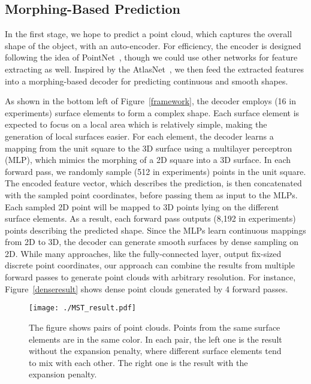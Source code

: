 \documentclass[letterpaper]{article} \usepackage{aaai20}  \usepackage{times}  \usepackage{helvet} \usepackage{courier}  \usepackage[hyphens]{url}  \usepackage{graphicx} \urlstyle{rm} \def\UrlFont{\rm}  \usepackage{graphicx}  \frenchspacing  \setlength{\pdfpagewidth}{8.5in}  \setlength{\pdfpageheight}{11in}  \usepackage{amsmath}
\begin{document}
\subsection{Morphing-Based Prediction} 
In the first stage, we hope to predict a point cloud, which captures the overall shape of the object, with an auto-encoder. For efficiency, the encoder is designed following the idea of PointNet~\cite{qi2017pointnet}, though we could use other networks for feature extracting as well. Inspired by the AtlasNet~\cite{groueix2018papier}, we then feed the extracted features into a morphing-based decoder for predicting continuous and smooth shapes.

As shown in the bottom left of Figure~\ref {framework}, the decoder employs  (16 in experiments) surface elements to form a complex shape. Each surface element is expected to focus on a local area which is relatively simple, making the generation of local surfaces easier. For each element, the decoder learns a mapping from the unit square  to the 3D surface using a multilayer perceptron (MLP), which mimics the morphing of a 2D square into a 3D surface. In each forward pass, we randomly sample  (512 in experiments) points in the unit square. The encoded feature vector, which describes the prediction, is then concatenated with the sampled point coordinates, before passing them as input to the  MLPs. Each sampled 2D point will be mapped to  3D points lying on the  different surface elements. As a result, each forward pass outputs  (8,192 in experiments) points describing the predicted shape. Since the MLPs learn continuous mappings from 2D to 3D, the decoder can generate smooth surfaces by dense sampling on 2D. While many approaches, like the fully-connected layer, output fix-sized discrete point coordinates, our approach can combine the results from multiple forward passes to generate point clouds with arbitrary resolution. For instance, Figure~\ref{denseresult} shows dense point clouds generated by 4 forward passes.


\begin{figure}[t]
  \centering
  \texttt{[image: ./MST\_result.pdf]}
  \caption{The figure shows pairs of point clouds. Points from the same surface elements are in the same color. In each pair, the left one is the result without the expansion penalty, where different surface elements tend to mix with each other. The right one is the result with the expansion penalty.}
  \label{fig:mst_result}
\end{figure}
\end{document}
